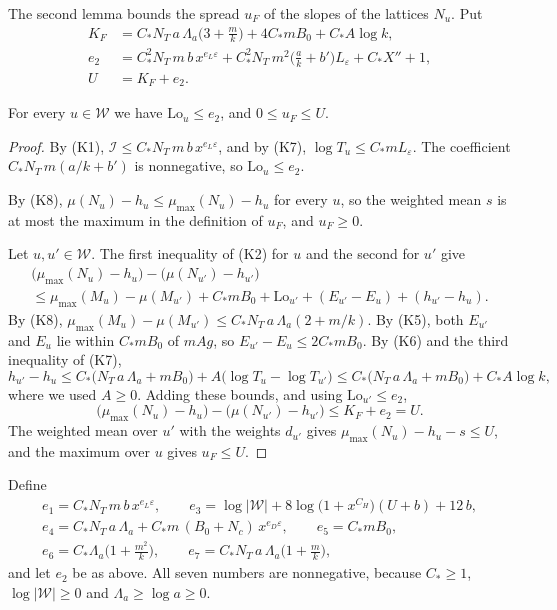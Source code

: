 The second lemma bounds the spread $u_F$ of the slopes of the lattices $N_u$. Put
\begin{align*}
K_F&=C_\ast N_T\,a\,\Lambda_a\Big(3+\frac mk\Big)+4C_\ast mB_0+C_\ast A\log k,\\
e_2&=C_\ast^2N_T\,m\,b\,x^{e_L\varepsilon}+C_\ast^2N_T\,m^2\Big(\frac ak+b'\Big)L_\varepsilon+C_\ast X''+1,\\
U&=K_F+e_2 .
\end{align*}

\begin{lemma}\label{r6:R6:lem:uF}
For every $u\in\mathcal W$ we have $\mathrm{Lo}_u\le e_2$, and $0\le u_F\le U$.
\end{lemma}

\begin{proof}
By (K1), $\mathcal I\le C_\ast N_T\,m\,b\,x^{e_L\varepsilon}$, and by (K7), $\log T_u\le C_\ast mL_\varepsilon$. The coefficient $C_\ast N_T\,m(a/k+b')$ is nonnegative, so $\mathrm{Lo}_u\le e_2$.

By (K8), $\mu(N_u)-h_u\le\mu_{\max}(N_u)-h_u$ for every $u$, so the weighted mean $s$ is at most the maximum in the definition of $u_F$, and $u_F\ge0$.

Let $u,u'\in\mathcal W$. The first inequality of (K2) for $u$ and the second for $u'$ give
\begin{multline*}
\big(\mu_{\max}(N_u)-h_u\big)-\big(\mu(N_{u'})-h_{u'}\big)\\
\le\mu_{\max}(M_u)-\mu(M_{u'})+C_\ast mB_0+\mathrm{Lo}_{u'}+(E_{u'}-E_u)+(h_{u'}-h_u).
\end{multline*}
By (K8), $\mu_{\max}(M_u)-\mu(M_{u'})\le C_\ast N_T\,a\,\Lambda_a(2+m/k)$. By (K5), both $E_{u'}$ and $E_u$ lie within $C_\ast mB_0$ of $mAg$, so $E_{u'}-E_u\le2C_\ast mB_0$. By (K6) and the third inequality of (K7),
\[
h_{u'}-h_u\le C_\ast\big(N_T\,a\,\Lambda_a+mB_0\big)+A\big(\log T_u-\log T_{u'}\big)\le C_\ast\big(N_T\,a\,\Lambda_a+mB_0\big)+C_\ast A\log k ,
\]
where we used $A\ge0$. Adding these bounds, and using $\mathrm{Lo}_{u'}\le e_2$,
\[
\big(\mu_{\max}(N_u)-h_u\big)-\big(\mu(N_{u'})-h_{u'}\big)\le K_F+e_2=U .
\]
The weighted mean over $u'$ with the weights $d_{u'}$ gives $\mu_{\max}(N_u)-h_u-s\le U$, and the maximum over $u$ gives $u_F\le U$.
\end{proof}

Define
\begin{gather*}
e_1=C_\ast N_T\,m\,b\,x^{e_L\varepsilon},\qquad e_3=\log\lvert\mathcal W\rvert+8\log\big(1+x^{C_H}\big)(U+b)+12\,b,\\
e_4=C_\ast N_T\,a\,\Lambda_a+C_\ast m\,(B_0+N_c)\,x^{e_D\varepsilon},\qquad e_5=C_\ast mB_0,\\
e_6=C_\ast\Lambda_a\Big(1+\frac{m^2}k\Big),\qquad e_7=C_\ast N_T\,a\,\Lambda_a\Big(1+\frac mk\Big),
\end{gather*}
and let $e_2$ be as above. All seven numbers are nonnegative, because $C_\ast\ge1$, $\log\lvert\mathcal W\rvert\ge0$ and $\Lambda_a\ge\log a\ge0$.

